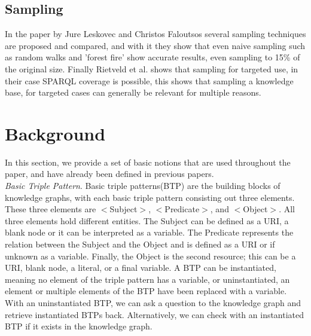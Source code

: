 \documentclass{article}
\begin{document}
\subsection{Sampling}
In the paper by Jure Leskovec and Christos Faloutsos \cite{Leskovec:2006} several sampling techniques are proposed and compared, and with it they show that even naive sampling such as random walks and 'forest fire' show accurate results, even sampling to 15\% of the original size. 
Finally Rietveld et al.\cite{Rietveld:2014} shows that sampling for targeted use, in their case SPARQL coverage is possible, this shows that sampling a knowledge base, for targeted cases can generally be relevant for multiple reasons.

\newpage
\section{Background}
In this section, we provide a set of basic notions that are used throughout the paper, and have already been defined in previous papers.\\

\textit{Basic Triple Pattern}. Basic triple patterns(BTP) are the building blocks of knowledge graphs, with each basic triple pattern consisting out three elements.
These three elements are $<$Subject$>$, $<$Predicate$>$, and $<$Object$>$. All three elements hold different entities. The Subject can be defined as a URI, a blank node or it can be interpreted as a variable. The Predicate represents the relation between the Subject and the Object and is defined as a URI or if unknown as a variable. Finally, the Object is the second resource; this can be a URI, blank node, a literal, or a final variable. A BTP can be instantiated, meaning no element of the triple pattern has a variable, or uninstantiated, an element or multiple elements of the BTP have been replaced with a variable. With an uninstantiated BTP, we can ask a question to the knowledge graph and retrieve instantiated BTPs back. Alternatively, we can check with an instantiated BTP if it exists in the knowledge graph.
\end{document}
